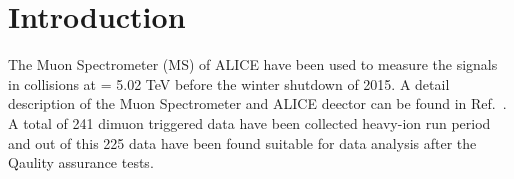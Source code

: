 \section{Introduction}

The Muon Spectrometer (MS) of  ALICE  have been used to measure the \upsi
signals in \PbPb collisions at \sqrtSnn = 5.02 TeV before the winter
shutdown of 2015. A detail description of the Muon Spectrometer and
ALICE deector can be found in Ref.~\cite{ALICEexpe}. A total of 241
\mub dimuon triggered data have been collected heavy-ion run period
and out of this 225 \mub data have been found suitable for data
analysis after the Qaulity assurance tests. 
